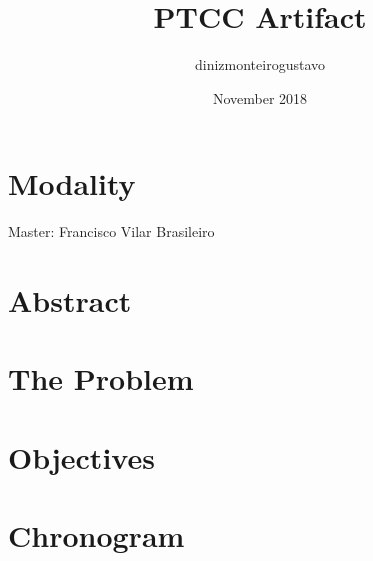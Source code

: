 \documentclass{article}
\title{PTCC Artifact}
\author{dinizmonteirogustavo }
\date{November 2018}
\begin{document}
\maketitle

\section{Modality}

Master: Francisco Vilar Brasileiro

\section{Abstract}

\section{The Problem}

\section{Objectives}

\section{Chronogram}
\end{document}
